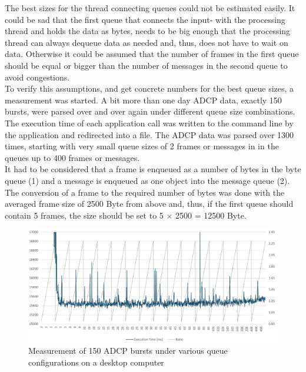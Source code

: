 The best sizes for the thread connecting queues could not be estimated easily. It could be sad that the first queue that connects the input- with the processing thread and holds the data as bytes, needs to be big enough that the processing thread can always dequeue data as needed and, thus, does not have to wait on data. Otherwise it could be assumed that the number of frames in the first queue should be equal or bigger than the number of messages in the second queue to avoid congestions.\\ 
To verify this assumptions, and get concrete numbers for the best queue sizes, a measurement was started. A bit more than one day ADCP data, exactly 150 bursts, were parsed over and over again under different queue size combinations. The execution time of each application call was written to the command line by the application and redirected into a file. The ADCP data was parsed over 1300 times, starting with very small queue sizes of 2 frames or messages in in the queues up to 400 frames or messages. \\
It had to be considered that a frame is enqueued as a number of bytes in the byte queue (1) and a message is enqueued as one object into the message queue (2). The conversion of a frame to the required number of bytes was done with the averaged frame size of 2500 Byte from above and, thus, if the first queue should contain 5 frames, the size should be set to 5 $\times$ 2500 = 12500 Byte.

\begin{figure}[hb]
\centering
      \includegraphics[width=1\textwidth]{conf_main}
        \caption{Measurement of 150 ADCP bursts under various queue configurations on a desktop computer}
\end{figure}

